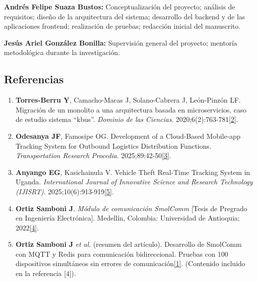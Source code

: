 \documentclass[
]{article}
\begin{document}
\textbf{Andrés Felipe Suaza Bustos:} Conceptualización del proyecto;
análisis de requisitos; diseño de la arquitectura del sistema;
desarrollo del backend y de las aplicaciones frontend; realización de
pruebas; redacción inicial del manuscrito.

\textbf{Jesús Ariel González Bonilla:} Supervisión general del proyecto;
mentoría metodológica durante la investigación.

\subsection{Referencias}\label{referencias}

\begin{enumerate}
\def\labelenumi{\arabic{enumi}.}
\item
  \textbf{Torres-Berru Y}, Camacho-Macas J, Solano-Cabrera J,
  León-Pinzón LF. Migración de un monolito a una arquitectura basada en
  microservicios, caso de estudio sistema ``kbus''. \emph{Dominio de las
  Ciencias}.
  2020;6(2):763-781\href{https://dialnet.unirioja.es/servlet/articulo?codigo=7425696\#:~:text=,monolito\%20previo\%20se\%20encontraba\%20en}{{[}2{]}}.
\item
  \textbf{Odesanya JF}, Famosipe OG. Development of a Cloud-Based
  Mobile-app Tracking System for Outbound Logistics Distribution
  Functions. \emph{Transportation Research Procedia}.
  2025;89:42-50\href{https://trid.trb.org/View/2571597\#:~:text=efficiency\%20for\%20product\%20delivery,for\%20server\%20setup\%2C\%20Docker\%2C\%20and}{{[}3{]}}.
\item
  \textbf{Anyango EG}, Kasichainula V. Vehicle Theft Real-Time Tracking
  System in Uganda. \emph{International Journal of Innovative Science
  and Research Technology (IJISRT)}.
  2025;10(6):913-919\href{https://fliphtml5.com/lqsof/cdpg/Art\%C3\%ADculos/\#:~:text=sistema,a\%206\%20metros\%2C\%20una\%20latencia}{{[}5{]}}.
\item
  \textbf{Ortiz Samboni J}. \emph{Módulo de comunicación SmolComm}
  {[}Tesis de Pregrado en Ingeniería Electrónica{]}. Medellín, Colombia:
  Universidad de Antioquia;
  2022\href{https://bibliotecadigital.udea.edu.co/entities/publication/3eb20d8e-dece-489f-8bcc-89f009b482cf\#:~:text=entre\%20las\%20m\%C3\%A1quinas\%20y\%20el,logrando\%20as\%C3\%AD\%20una\%20comunicaci\%C3\%B3n\%20bidireccional}{{[}4{]}}.
\item
  \textbf{Ortiz Samboni J} \emph{et al.} (resumen del artículo).
  Desarrollo de SmolComm con MQTT y Redis para comunicación
  bidireccional. Pruebas con 100 dispositivos simultáneos sin errores de
  comunicación\href{https://fliphtml5.com/lqsof/cdpg/Art\%C3\%ADculos/\#:~:text=permitiendo\%20un\%20flujo\%20de\%20datos,del\%20sistema\%20fue\%20un\%20rigurosa}{{[}1{]}}.
  (Contenido incluido en la referencia {[}4{]}).
\end{enumerate}
\end{document}
